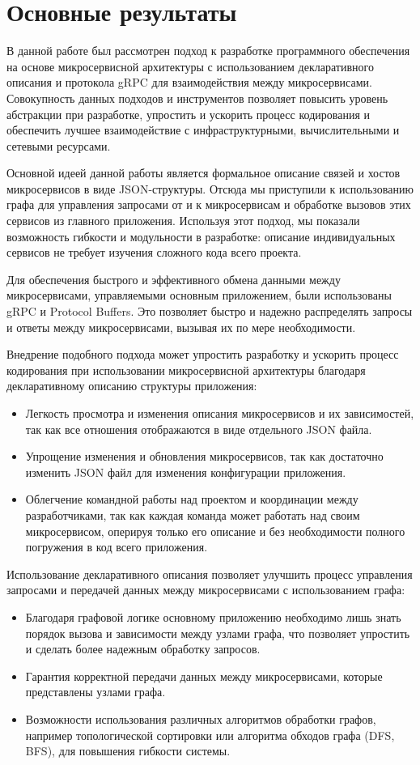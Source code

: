 \section{Основные результаты}
В данной работе был рассмотрен подход к разработке программного обеспечения на основе микросервисной архитектуры с использованием декларативного описания и протокола gRPC для взаимодействия между микросервисами. Совокупность данных подходов и инструментов позволяет повысить уровень абстракции при разработке, упростить и ускорить процесс кодирования и обеспечить лучшее взаимодействие с инфраструктурными, вычислительными и сетевыми ресурсами.

Основной идеей данной работы является формальное описание связей и хостов микросервисов в виде JSON-структуры. Отсюда мы приступили к использованию графа для управления запросами от и к микросервисам и обработке вызовов этих сервисов из главного приложения. Используя этот подход, мы показали возможность гибкости и модульности в разработке: описание индивидуальных сервисов не требует изучения сложного кода всего проекта.

Для обеспечения быстрого и эффективного обмена данными между микросервисами, управляемыми основным приложением, были использованы gRPC и Protocol Buffers. Это позволяет быстро и надежно распределять запросы и ответы между микросервисами, вызывая их по мере необходимости. 

Внедрение подобного подхода может упростить разработку и ускорить процесс кодирования при использовании микросервисной архитектуры благодаря декларативному описанию структуры приложения:
\begin{itemize}
    \item Легкость просмотра и изменения описания микросервисов и их зависимостей, так как все отношения отображаются в виде отдельного JSON файла.
    \item Упрощение изменения и обновления микросервисов, так как достаточно изменить JSON файл для изменения конфигурации приложения.
    \item Облегчение командной работы над проектом и координации между разработчиками, так как каждая команда может работать над своим микросервисом, оперируя только его описание и без необходимости полного погружения в код всего приложения.
\end{itemize}

Использование декларативного описания позволяет улучшить процесс управления запросами и передачей данных между микросервисами с использованием графа:
\begin{itemize}
    \item Благодаря графовой логике основному приложению необходимо лишь знать порядок вызова и зависимости между узлами графа, что позволяет упростить и сделать более надежным обработку запросов.
    \item Гарантия корректной передачи данных между микросервисами, которые представлены узлами графа.
    \item Возможности использования различных алгоритмов обработки графов, например топологической сортировки или алгоритма обходов графа (DFS, BFS), для повышения гибкости системы.
\end{itemize}


